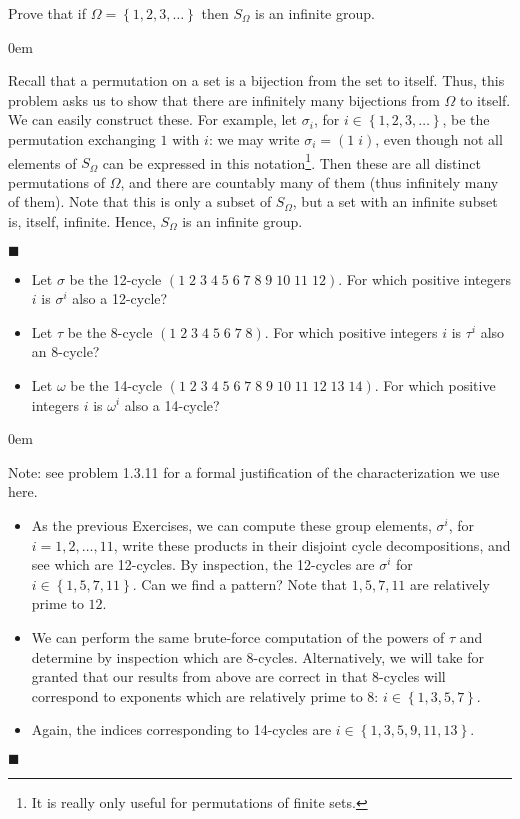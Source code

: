 \documentclass[12pt]{article}
\renewcommand{\qed}{\hfill$\blacksquare$}
\renewenvironment{proof}{\begin{addmargin}[1em]{0em}\begin{newproof}}{\end{newproof}\end{addmargin}\qed}
\newenvironment{problem}[2][Exercise]{\begin{trivlist}
\item[\hskip \labelsep {\bfseries #1}\hskip \labelsep {\bfseries #2.}]}{\end{trivlist}}
\begin{document}
\begin{problem}{1.3.8} Prove that if $\Omega = \left\{1,2,3,\ldots\right\}$ then $S_{\Omega}$ is an infinite group.
\end{problem}
\begin{proof}
Recall that a permutation on a set is a bijection from the set to itself. Thus, this problem asks us to show that there are infinitely many bijections from $\Omega$ to itself. We can easily construct these. For example, let $\sigma_i$, for $i\in \left\{1,2,3,\ldots\right\}$, be the permutation exchanging $1$ with $i$: we may write $\sigma_i=\left(1\; i\right)$, even though not all elements of $S_{\Omega}$ can be expressed in this notation\footnote{It is really only useful for permutations of finite sets.}.  Then these are all distinct permutations of $\Omega$, and there are countably many of them (thus infinitely many of them). Note that this is only a subset of $S_{\Omega}$, but a set with an infinite subset is, itself, infinite. Hence, $S_{\Omega}$ is an infinite group.
\end{proof}




\begin{problem}{1.3.9}
\begin{itemize}
    \item Let $\sigma$ be the 12-cycle $\left(1\;2\;3\;4\;5\;6\;7\;8\;9\;10\;11\;12\right)$. For which positive integers $i$ is $\sigma^i$ also a 12-cycle?
    \item Let $\tau$ be the 8-cycle $\left(1\;2\;3\;4\;5\;6\;7\;8\right)$. For which positive integers $i$ is $\tau^i$ also an $8$-cycle?
    \item Let $\omega$ be the 14-cycle $\left(1\;2\;3\;4\;5\;6\;7\;8\;9\;10\;11\;12\;13\;14\right)$. For which positive integers $i$ is $\omega^i$ also a 14-cycle?
\end{itemize}
\end{problem}
\begin{proof}
Note: see problem 1.3.11 for a formal justification of the characterization we use here.
\begin{itemize}
    \item As the previous Exercises, we can compute these group elements, $\sigma^i$, for $i=1,2,\ldots,11$, write these products in their disjoint cycle decompositions, and see which are 12-cycles. By inspection, the 12-cycles are $\sigma^i$ for $i\in \left\{1,5,7,11\right\}$. Can we find a pattern? Note that $1,5,7,11$ are relatively prime to $12$.
    \item We can perform the same brute-force computation of the powers of $\tau$ and determine by inspection which are 8-cycles. Alternatively, we will take for granted that our results from above are correct in that 8-cycles will correspond to exponents which are relatively prime to 8: $i\in \left\{1,3,5,7\right\}$.
    \item Again, the indices corresponding to 14-cycles are $i\in \left\{1,3,5,9,11,13\right\}$.
\end{itemize}
\end{proof}
\end{document}
